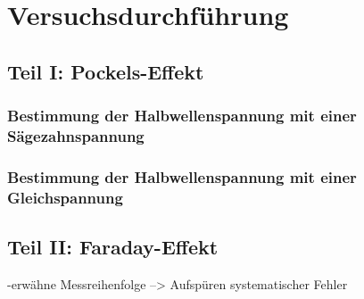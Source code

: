 \section{Versuchsdurchführung}
\subsection{Teil I: Pockels-Effekt}
\subsubsection{Bestimmung der Halbwellenspannung mit einer Sägezahnspannung}
\subsubsection{Bestimmung der Halbwellenspannung mit einer Gleichspannung}

\subsection{Teil II: Faraday-Effekt}
-erwähne Messreihenfolge --> Aufspüren systematischer Fehler